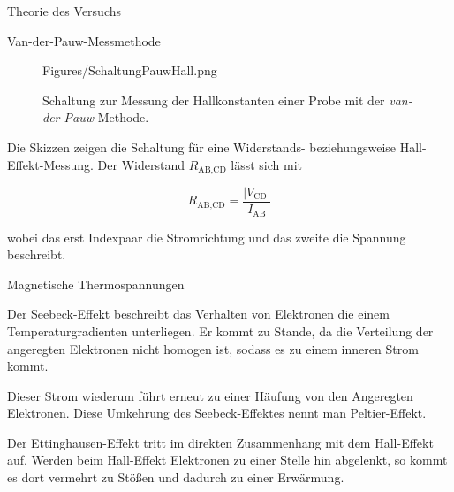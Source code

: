 \documentclass[pdftex, a4paper,11pt, twoside, ngerman]{report}
\newcommand\abs[1]{\left| #1 \right|}
\begin{document}
\begin{chapter}{Theorie des Versuchs}
\begin{section}{Van-der-Pauw-Messmethode}
\begin{figure}[ht!]
\begin{minipage}{.48\textwidth}
                    {Figures/SchaltungPauwHall.png}
                \caption{Schaltung zur Messung der Hallkonstanten einer Probe
                    mit der \textit{van-der-Pauw} Methode.}
                \label{fig:SchaltungPauwHall}
              \end{minipage}
            \end{figure}
            
            Die Skizzen zeigen die Schaltung für eine Widerstands- beziehungsweise Hall-Effekt-Messung.
            Der Widerstand $R_\text{AB,CD}$ lässt sich mit 
            
            \begin{equation}
                R_\text{AB,CD} = \frac{\abs{V_\text{CD}}}{I_\text{AB}}
            \end{equation}

            wobei das erst Indexpaar die Stromrichtung und das zweite die Spannung beschreibt.



        \end{section}

        \begin{section}{Magnetische Thermospannungen}

                Der Seebeck-Effekt beschreibt das Verhalten von Elektronen die einem Temperaturgradienten unterliegen. 
                Er kommt zu Stande, da die Verteilung der angeregten Elektronen nicht homogen ist, sodass es zu einem inneren Strom kommt.
                
                Dieser Strom wiederum führt erneut zu einer Häufung von den Angeregten Elektronen.
                Diese Umkehrung des Seebeck-Effektes nennt man Peltier-Effekt.


                Der Ettinghausen-Effekt tritt im direkten Zusammenhang mit dem Hall-Effekt auf.
                Werden beim Hall-Effekt Elektronen zu einer Stelle hin abgelenkt, so kommt es dort vermehrt zu Stößen und dadurch zu einer Erwärmung.
                

\end{section}
\end{chapter}
\end{document}
